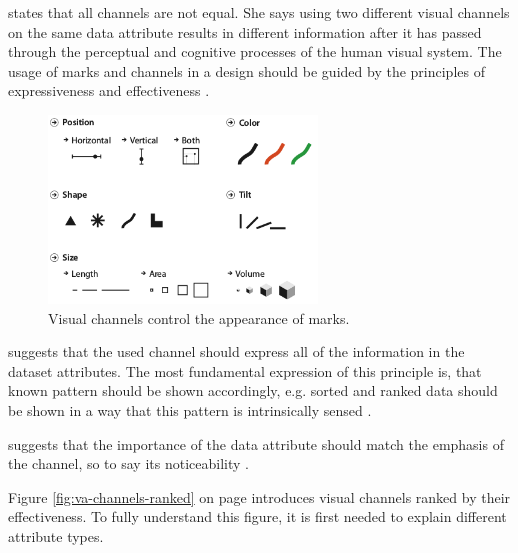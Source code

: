 \citeauthor{Munzner2014} states that all channels are not equal. She says using two different visual channels on the same data attribute results in different information after it has passed through the perceptual and cognitive processes of the human visual system. The usage of marks and channels in a design should be guided by the principles of expressiveness and effectiveness .

\begin{figure}[!htb]
\centering
\includegraphics[height=5cm,keepaspectratio]{images/va/channels.png}
\caption[
    Visual channels control the appearance of marks .
]{Visual channels control the appearance of marks.}
\label{fig:va-channels}
\end{figure}

\begin{enumerate}
 suggests that the used channel should express all of the information in the dataset attributes. The most fundamental expression of this principle is, that known pattern should be shown accordingly, e.g. sorted and ranked data should be shown in a way that this pattern is intrinsically sensed .

 suggests that the importance of the data attribute should match the emphasis of the channel, so to say its noticeability .
\end{enumerate}

Figure \ref{fig:va-channels-ranked} on page \pageref{fig:va-channels-ranked} introduces visual channels ranked by their effectiveness. To fully understand this figure, it is first needed to explain different attribute types.

